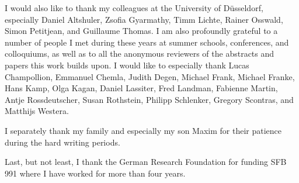 \begin{refsection}
I would also like to thank my colleagues at the University of Düsseldorf, especially Daniel Altshuler, Zsofia Gyarmathy, Timm Lichte, Rainer Osswald, Simon Petitjean, and Guillaume Thomas. I am also profoundly grateful to a number of people I met during these years at summer schools, conferences, and colloquiums, as well as to all the anonymous reviewers of the abstracts and papers this work builds upon. I would like to especially thank Lucas Champollion, Emmanuel Chemla, Judith Degen, Michael Frank, Michael Franke, Hans Kamp, Olga Kagan, Daniel Lassiter, Fred Landman, Fabienne Martin, Antje Rossdeutscher, Susan Rothstein, Philipp Schlenker, Gregory Scontras, and Matthijs Westera.

I separately thank my family and especially my son Maxim for their patience during the hard writing periods.

Last, but not least, I thank the German Research Foundation for funding SFB 991 where I have worked for more than four years. 
\printbibliography[heading=subbibliography]
\end{refsection}

